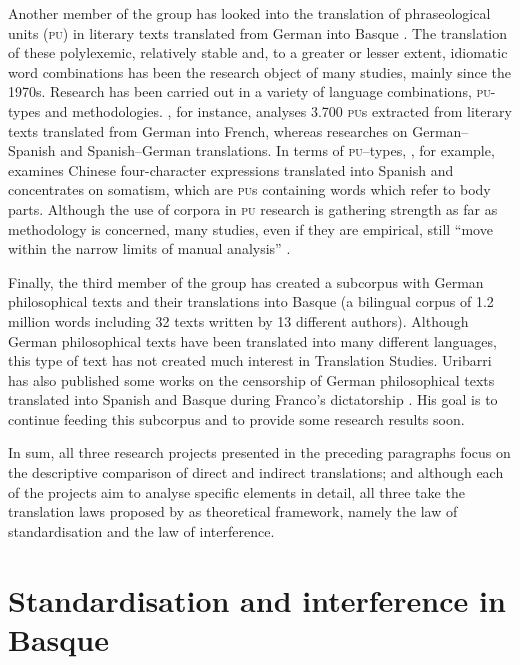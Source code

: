 \documentclass[output=paper]{LSP/langsci}
\begin{document}
Another member of the group has looked into the translation of phraseological units (\textsc{pu}) in literary texts translated from German into Basque \citep{Sanz2013}. The translation of these polylexemic, relatively stable and, to a greater or lesser extent, idiomatic word combinations has been the research object of many studies, mainly since the 1970s. Research has been carried out in a variety of language combinations, \textsc{pu}-types and methodologies. \citet{Higi1989}, for instance, analyses 3.700 \textsc{pu}s extracted from literary texts translated from German into French, whereas \citet{Segura1998} researches on German--Spanish and Spanish--German translations. In terms of \textsc{pu}--types, \citet{Ji2010}, for example, examines Chinese four-character expressions translated into Spanish and \citet{vanLawick2006} concentrates on somatism, which are \textsc{pu}s containing words which refer to body parts. Although the use of corpora in \textsc{pu} research is gathering strength as far as methodology is concerned, many studies, even if they are empirical, still “move within the narrow limits of manual analysis” \citep[843]{Marco2009}.

Finally, the third member of the group has created a subcorpus with German philosophical texts and their translations into Basque (a bilingual corpus of 1.2 million words including 32 texts written by 13 different authors). Although German philosophical texts have been translated into many different languages, this type of text has not created much interest in Translation Studies. Uribarri has also published some works on the censorship of German philosophical texts translated into Spanish and Basque during Franco's dictatorship \citep{Uribarri2008,Uribarri2010}. His goal is to continue feeding this subcorpus and to provide some research results soon.

In sum, all three research projects presented in the preceding paragraphs focus on the descriptive comparison of direct and indirect translations; and although each of the projects aim to analyse specific elements in detail, all three take the translation laws proposed by  \citet{Toury2012} as theoretical framework, namely the law of standardisation and the law of interference.

\section{Standardisation and interference in Basque}
\end{document}
